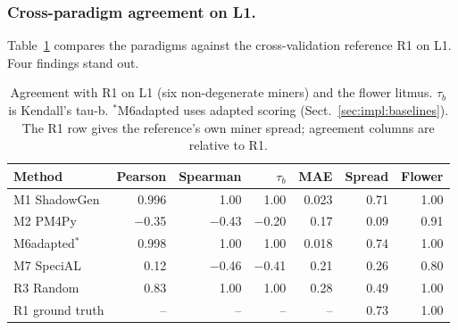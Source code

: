 \documentclass[runningheads]{llncs}
\newcommand{\chg}[1]{#1}
\begin{document}
\subsubsection{Cross-paradigm agreement on L1.}
\label{sec:eval:external}



Table~\ref{tab:corr} compares the paradigms against the cross-validation reference R1 on L1. Four findings stand out.

\begin{table}[!ht]
\centering
\caption{Agreement with R1 on L1 (six non-degenerate miners) and the flower litmus. $\tau_b$ is Kendall's tau-b. \chg{$^{*}$M6adapted uses adapted scoring (Sect.~\ref{sec:impl:baselines}).} The R1 row gives the reference's own miner spread; agreement columns are relative to R1.}
\label{tab:corr}
\setlength{\tabcolsep}{4.5pt}
\footnotesize
\begin{tabular}{@{}lrrrrrr@{}}
\toprule
Method & Pearson & Spearman & $\tau_b$ & MAE & Spread & Flower \\
\midrule
M1 ShadowGen  & 0.996 & 1.00 & 1.00 & 0.023 & 0.71 & 1.00 \\
M2 PM4Py         & $-$0.35 & $-$0.43 & $-$0.20 & 0.17 & 0.09 & 0.91 \\
M6adapted$^{*}$ & 0.998 & 1.00 & 1.00 & 0.018 & 0.74 & 1.00 \\
M7 SpeciAL       & 0.12 & $-$0.46 & $-$0.41 & 0.21 & 0.26 & 0.80 \\
R3 Random        & 0.83 & 1.00 & 1.00 & 0.28 & 0.49 & 1.00 \\
\midrule
R1 ground truth  & --   & --   & --   & --   & 0.73 & 1.00 \\
\bottomrule
\end{tabular}
\end{table}
\end{document}
